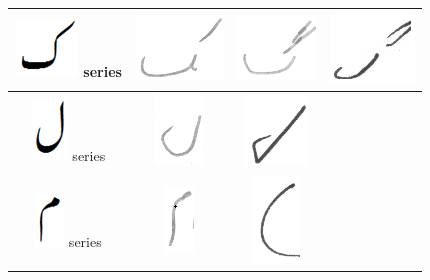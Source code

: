 \documentclass[a4paper,conference]{IEEEtran}
\begin{document}
\begin{table}[h]
\begin{tabular}{@{}cccc@{}}
\hline
\includegraphics[scale=0.15]{kaaf_orig} series & \includegraphics[scale=0.15]{104} & \includegraphics[scale=0.15]{105}  & 
\includegraphics[scale=0.15]{106} \\
\hline
\includegraphics[scale=0.15]{Laam_orig} series & \includegraphics[scale=0.15]{107} & \includegraphics[scale=0.15]{108}  &  \\
\hline
\includegraphics[scale=0.15]{meem_orig} series & \includegraphics[scale=0.15]{109} & \includegraphics[scale=0.15]{110}  &  \\

\end{tabular}
\end{table}
\end{document}

